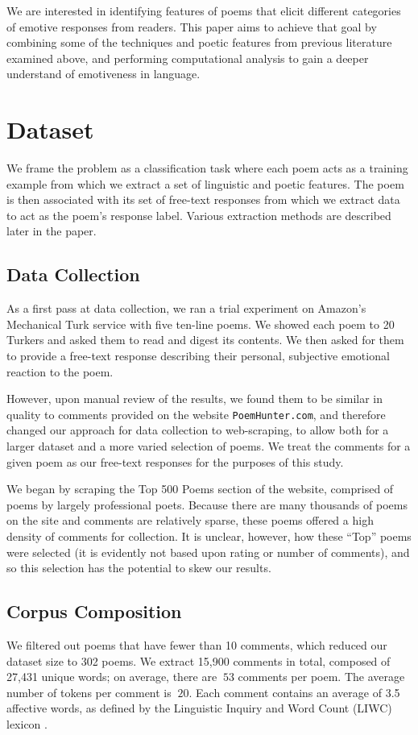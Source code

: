 \documentclass[11pt]{article}
\begin{document}
We are interested in identifying features of poems that elicit different categories of emotive responses from readers. This paper aims to achieve that goal by combining some of the techniques and poetic features from previous literature examined above, and performing computational analysis to gain a deeper understand of emotiveness in language.


\section{Dataset}
We frame the problem as a classification task where each poem acts as a training example from which we extract a set of linguistic and poetic features. The poem is then associated with its set of free-text responses from which we extract data to act as the poem's response label. Various extraction methods are described later in the paper. 

\subsection{Data Collection}
As a first pass at data collection, we ran a trial experiment on Amazon's Mechanical Turk service with five ten-line poems. We showed each poem to 20 Turkers and asked them to read and digest its contents. We then asked for them to provide a free-text response describing their personal, subjective emotional reaction to the poem. 

However, upon manual review of the results, we found them to be similar in quality to comments provided on the website \texttt{PoemHunter.com}, and therefore changed our approach for data collection to web-scraping, to allow both for a larger dataset and a more varied selection of poems. We treat the comments for a given poem as our free-text responses for the purposes of this study.

We began by scraping the Top 500 Poems section of the website, comprised of poems by largely professional poets. Because there are many thousands of poems on the site and comments are relatively sparse, these poems offered a high density of comments for collection. It is unclear, however, how these ``Top'' poems were selected (it is evidently not based upon rating or number of comments), and so this selection has the potential to skew our results. 


\subsection{Corpus Composition}
We filtered out poems that have fewer than 10 comments, which reduced our dataset size to 302 poems. We extract 15,900 comments in total, composed of 27,431 unique words; on average, there are $~53$ comments per poem. The average number of tokens per comment is $~20$. Each comment contains an average of 3.5 affective words, as defined by the Linguistic Inquiry and Word Count (LIWC) lexicon \cite{pennebaker2001linguistic}.
\end{document}

